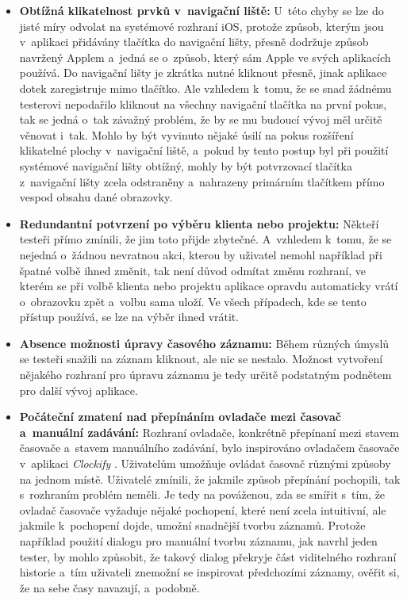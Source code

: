 \begin{itemize}
\item\textbf{Obtížná klikatelnost prvků v~navigační liště:} U~této chyby se lze do jisté míry odvolat na systémové rozhraní iOS, protože způsob, kterým jsou v~aplikaci přidávány tlačítka do navigační lišty, přesně dodržuje způsob navržený Applem a~jedná se o~způsob, který sám Apple ve svých aplikacích používá. Do navigační lišty je zkrátka nutné kliknout přesně, jinak aplikace dotek zaregistruje mimo tlačítko. Ale vzhledem k~tomu, že se snad žádnému testerovi nepodařilo kliknout na všechny navigační tlačítka na první pokus, tak se jedná o~tak závažný problém, že by se mu budoucí vývoj měl určitě věnovat i~tak. Mohlo by být vyvinuto nějaké úsilí na pokus rozšíření klikatelné plochy v~navigační liště, a~pokud by tento postup byl při použití systémové navigační lišty obtížný, mohly by být potvrzovací tlačítka z~navigační lišty zcela odstraněny a~nahrazeny primárním tlačítkem přímo vespod obsahu dané obrazovky.
\item\textbf{Redundantní potvrzení po výběru klienta nebo projektu:} Někteří testeři přímo zmínili, že jim toto přijde zbytečné. A~vzhledem k~tomu, že se nejedná o~žádnou nevratnou akci, kterou by uživatel nemohl například při špatné volbě ihned změnit, tak není důvod odmítat změnu rozhraní, ve kterém se při volbě klienta nebo projektu aplikace opravdu automaticky vrátí o~obrazovku zpět a~volbu sama uloží. Ve všech případech, kde se tento přístup používá, se lze na výběr ihned vrátit.
\item\textbf{Absence možnosti úpravy časového záznamu:} Během různých úmyslů se testeři snažili na záznam kliknout, ale nic se nestalo. Možnost vytvoření nějakého rozhraní pro úpravu záznamu je tedy určitě podstatným podnětem pro další vývoj aplikace.
\item\textbf{Počáteční zmatení nad přepínáním ovladače mezi časovač a~manuální zadávání:} Rozhraní ovladače, konkrétně přepínaní mezi stavem časovače a~stavem manuálního zadávání, bylo inspirováno ovladačem časovače v~aplikaci \emph{Clockify} \cite{clockify-ios}. Uživatelům umožňuje ovládat časovač různými způsoby na jednom místě. Uživatelé zmínili, že jakmile způsob přepínání pochopili, tak s~rozhraním problém neměli. Je tedy na pováženou, zda se smířit s~tím, že ovladač časovače vyžaduje nějaké pochopení, které není zcela intuitivní, ale jakmile k~pochopení dojde, umožní snadnější tvorbu záznamů. Protože například použití dialogu pro manuální tvorbu záznamu, jak navrhl jeden tester, by mohlo způsobit, že takový dialog překryje část viditelného rozhraní historie a~tím uživateli znemožní se inspirovat předchozími záznamy, ověřit si, že na sebe časy navazují, a~podobně.

\end{itemize}
